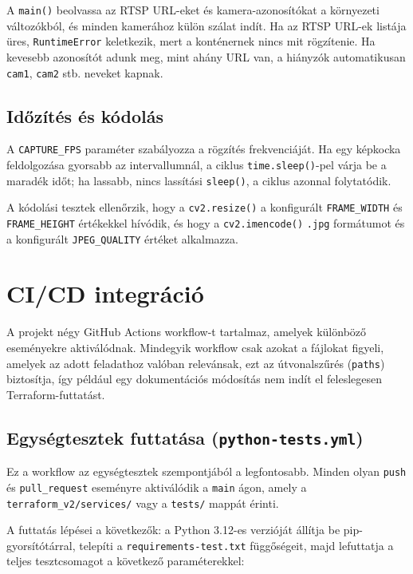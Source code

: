 \documentclass[12pt,a4paper]{article}
\begin{document}
A \texttt{main()} beolvassa az RTSP URL-eket és kamera-azonosítókat a környezeti
változókból, és minden kamerához külön szálat indít. Ha az RTSP URL-ek listája
üres, \texttt{RuntimeError} keletkezik, mert a konténernek nincs mit rögzítenie.
Ha kevesebb azonosítót adunk meg, mint ahány URL van, a hiányzók automatikusan
\texttt{cam1}, \texttt{cam2} stb. neveket kapnak.

\subsection{Időzítés és kódolás}

A \texttt{CAPTURE\_FPS} paraméter szabályozza a rögzítés frekvenciáját. Ha egy
képkocka feldolgozása gyorsabb az intervallumnál, a ciklus \texttt{time.sleep()}-pel
várja be a maradék időt; ha lassabb, nincs lassítási \texttt{sleep()}, a ciklus
azonnal folytatódik.

A kódolási tesztek ellenőrzik, hogy a \texttt{cv2.resize()} a konfigurált
\texttt{FRAME\_WIDTH} és \texttt{FRAME\_HEIGHT} értékekkel hívódik, és hogy a
\texttt{cv2.imencode()} \texttt{.jpg} formátumot és a konfigurált
\texttt{JPEG\_QUALITY} értéket alkalmazza.

\section{CI/CD integráció}

A projekt négy GitHub Actions workflow-t tartalmaz, amelyek különböző eseményekre
aktiválódnak. Mindegyik workflow csak azokat a fájlokat figyeli, amelyek az adott
feladathoz valóban relevánsak, ezt az útvonalszűrés (\texttt{paths}) biztosítja,
így például egy dokumentációs módosítás nem indít el feleslegesen Terraform-futtatást.

\subsection{Egységtesztek futtatása (\texttt{python-tests.yml})}

Ez a workflow az egységtesztek szempontjából a legfontosabb. Minden olyan
\texttt{push} és \texttt{pull\_request} eseményre aktiválódik a \texttt{main}
ágon, amely a \texttt{terraform\_v2/services/} vagy a \texttt{tests/} mappát érinti.

A futtatás lépései a következők: a Python 3.12-es verzióját állítja be pip-gyorsítótárral,
telepíti a \texttt{requirements-test.txt} függőségeit, majd lefuttatja a teljes
tesztcsomagot a következő paraméterekkel:
\end{document}
